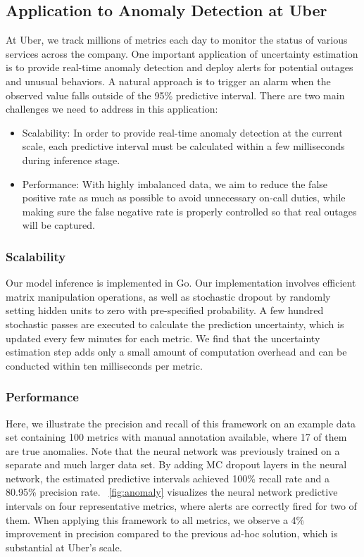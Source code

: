\documentclass[conference,compsoc,final]{IEEEtran}
\begin{document}
\subsection{Application to Anomaly Detection 
at Uber
}

At Uber,
we track millions of metrics each day to monitor the status of various services across the company. One important application of uncertainty estimation is to provide real-time anomaly detection and deploy alerts for potential outages and unusual behaviors. A natural approach is to trigger an alarm when the observed value falls outside of the 95\% predictive interval. There are two main challenges we need to address in this application:
\begin{itemize}
\item Scalability: In order to provide real-time anomaly detection at the current scale, each predictive interval must be calculated within a few milliseconds during inference stage. 
\item Performance: With highly imbalanced data, we aim to reduce the false positive rate as much as possible to avoid unnecessary on-call duties, while making sure the false negative rate is properly controlled so that real outages will be captured.
\end{itemize}

\subsubsection{Scalability}
Our model inference is implemented in Go. Our implementation involves efficient matrix manipulation operations, as well as stochastic dropout by randomly setting hidden units to zero with pre-specified probability. A few hundred stochastic passes are executed to calculate the prediction uncertainty, which is updated every few minutes for each metric. We find that the uncertainty estimation step adds only a small amount of computation overhead and can be conducted within ten milliseconds per metric.

\subsubsection{Performance}
Here, we illustrate the precision and recall of this framework on an example data set containing 100 metrics with manual annotation available, where 17 of them are true anomalies. Note that the neural network was previously trained on a separate and much larger data set. By adding MC dropout layers in the neural network, the estimated predictive intervals achieved 100\% recall rate and a 80.95\% precision rate. \figurename~\ref{fig:anomaly} visualizes the neural network predictive intervals on four representative metrics, where alerts are correctly fired for two of them. When applying this framework to all metrics, we observe a 4\% improvement in precision compared to the previous ad-hoc solution, which is substantial at Uber's scale.
\end{document}
